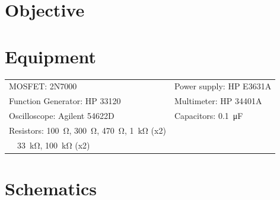 

\section{Objective}
\label{sec:objective}


\section{Equipment}
\label{sec:equipment}

\begin{tabular}{ll}
  \centering
  MOSFET: 2N7000               & Power supply: HP E3631A            \\
  Function Generator: HP 33120 & Multimeter: HP 34401A              \\
  Oscilloscope: Agilent 54622D & Capacitors: \SI{0.1}{\micro\farad} \\
  Resistors: \SI{100}{\ohm}, \SI{300}{\ohm}, \SI{470}{\ohm}, \SI{1}{\kilo\ohm} (x2) & \\
  ~~\SI{33}{\kilo\ohm}, \SI{100}{\kilo\ohm} (x2) & \\
\end{tabular}

\section{Schematics}
\label{sec:schematics}


